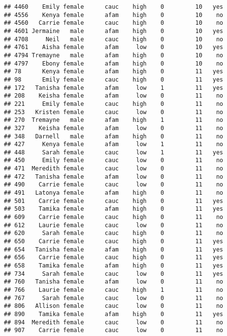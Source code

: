 \documentclass[
]{article}
\begin{document}
\begin{verbatim}
## 4460    Emily female      cauc    high    0         10   yes
## 4556    Kenya female      afam    high    0         10    no
## 4560   Carrie female      cauc    high    0         10    no
## 4601 Jermaine   male      afam    high    0         10   yes
## 4708     Neil   male      cauc    high    0         10    no
## 4761    Aisha female      afam     low    0         10   yes
## 4794 Tremayne   male      afam    high    0         10    no
## 4797    Ebony female      afam    high    0         10    no
## 78      Kenya female      afam    high    0         11   yes
## 98      Emily female      cauc    high    0         11   yes
## 172   Tanisha female      afam     low    1         11   yes
## 208    Keisha female      afam     low    0         11    no
## 221     Emily female      cauc    high    0         11    no
## 253   Kristen female      cauc     low    0         11    no
## 270  Tremayne   male      afam    high    1         11    no
## 327    Keisha female      afam     low    0         11    no
## 348   Darnell   male      afam    high    0         11    no
## 427     Kenya female      afam     low    1         11    no
## 448     Sarah female      cauc     low    1         11   yes
## 450     Emily female      cauc     low    0         11    no
## 471  Meredith female      cauc     low    0         11    no
## 472   Tanisha female      afam     low    0         11    no
## 490    Carrie female      cauc     low    0         11    no
## 491   Latonya female      afam    high    0         11    no
## 501    Carrie female      cauc    high    0         11   yes
## 503    Tamika female      afam    high    0         11   yes
## 609    Carrie female      cauc    high    0         11    no
## 612    Laurie female      cauc     low    0         11    no
## 620     Sarah female      cauc    high    0         11    no
## 650    Carrie female      cauc    high    0         11   yes
## 654   Tanisha female      afam    high    0         11   yes
## 656    Carrie female      cauc    high    0         11   yes
## 658    Tamika female      afam    high    0         11   yes
## 734     Sarah female      cauc     low    0         11   yes
## 760   Tanisha female      afam     low    0         11    no
## 766    Laurie female      cauc    high    1         11    no
## 767     Sarah female      cauc     low    0         11    no
## 806   Allison female      cauc     low    0         11    no
## 890    Tamika female      afam    high    0         11   yes
## 894  Meredith female      cauc     low    0         11    no
## 907    Carrie female      cauc     low    0         11    no

\end{verbatim}
\end{document}
